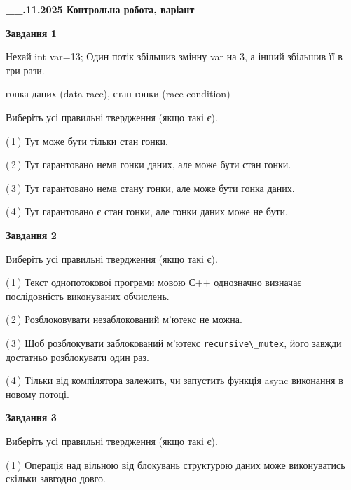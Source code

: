 \documentclass[12pt, ukrainian]{article}
\def\code#1{\Verb!#1!}
\begin{document}
\begin {large}

\textbf{\_\_.11.2025 Контрольна робота, варіант  }\par


{

\begin{center}
\textbf{Завдання 1}
\end{center}
Нехай int var=13; Один потік збільшив змінну var на 3, а інший збільшив її в три рази.

гонка даних (data race), стан гонки (race condition)

Виберіть усі правильні твердження (якщо такі є).\par
\vspace{2mm}
(\,1\,) Тут може бути тільки стан гонки.%

(\,2\,) Тут гарантовано нема гонки даних, але може бути стан гонки.%

(\,3\,) Тут гарантовано нема стану гонки, але може бути гонка даних.%

(\,4\,) Тут гарантовано є стан гонки, але гонки даних може не бути.%



\begin{center}
\textbf{Завдання 2}
\end{center}
Виберіть усі правильні твердження (якщо такі є).\par
\vspace{2mm}

(\,1\,) Текст однопотокової програми мовою С++ однозначно визначає послідовність виконуваних обчислень.%

(\,2\,) Розблоковувати незаблокований м’ютекс не можна.%

(\,3\,) Щоб розблокувати заблокований м’ютекс \code{recursive\_mutex}, його завжди достатньо розблокувати один раз.%

(\,4\,) Тільки від компілятора залежить, чи запустить функція async виконання в новому потоці.%



\begin{center}
\textbf{Завдання 3}
\end{center}
Виберіть усі правильні твердження (якщо такі є).\par
\vspace{2mm}

(\,1\,) Операція над вільною від блокувань структурою даних може виконуватись скільки завгодно довго.%

}
\end{large}
\end{document}

